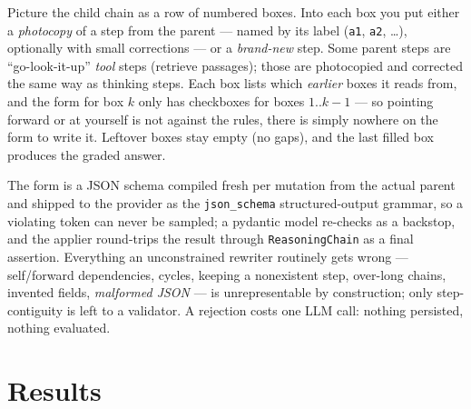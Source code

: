 \documentclass[11pt]{article}
\newenvironment{eli5}
  {\par\medskip\noindent\begin{lrbox}{\eliBox}\begin{minipage}{\dimexpr\linewidth-2\fboxsep-2\fboxrule}\small}
  {\end{minipage}\end{lrbox}\noindent\fcolorbox{accent!40}{accent!4}{\usebox{\eliBox}}\par\medskip}
\begin{document}
\begin{eli5}
Picture the child chain as a row of numbered boxes. Into each box you put either a
\emph{photocopy} of a step from the parent --- named by its label (\texttt{a1}, \texttt{a2},
\dots), optionally with small corrections --- or a \emph{brand-new} step. Some parent steps are
``go-look-it-up'' \emph{tool} steps (retrieve passages); those are photocopied and corrected the
same way as thinking steps. Each box lists which \emph{earlier} boxes it reads from, and the
form for box $k$ only has checkboxes for boxes $1..k{-}1$ --- so pointing forward or at yourself
is not against the rules, there is simply nowhere on the form to write it. Leftover boxes stay
empty (no gaps), and the last filled box produces the graded answer.
\end{eli5}
\noindent
The form is a JSON schema compiled fresh per mutation from the actual parent and shipped to the
provider as the \texttt{json\_schema} structured-output grammar, so a violating token can never
be sampled; a pydantic model re-checks as a backstop, and the applier round-trips the result
through \texttt{ReasoningChain} as a final assertion. Everything an unconstrained rewriter
routinely gets wrong --- self/forward dependencies, cycles, keeping a nonexistent step,
over-long chains, invented fields, \emph{malformed JSON} --- is unrepresentable by construction;
only step-contiguity is left to a validator. A rejection costs one LLM call: nothing persisted,
nothing evaluated.

\section{Results}
\label{sec:results}
\end{document}
